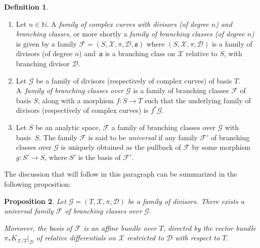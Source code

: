 \documentclass[10pt]{amsart}
\newcommand{\skpt}{\par\smallskip}
\newcommand{\N}{\mathbb N}
\theoremstyle{definition}
\newtheorem{definition}{Definition}[subsection]
\theoremstyle{plain}
\newtheorem{proposition}[definition]{Proposition}
\begin{document}
\skpt
\begin{definition}\label{definition_families_bc}
\begin{enumerate}
\item
Let $n \in \N$.
A \emph{family of complex curves with divisors (of degree $n$) and branching classes}, or more shortly a \emph{family of branching classes (of degree $n$)} is given by a family $\mathcal F = (S, \mathcal X, \pi, \mathcal D, \mathfrak a)$ where $(S, \mathcal X, \pi, \mathcal D)$ is a family of divisors (of degree $n$) and~$\mathfrak a$ is a branching class on $\mathcal X$ relative to $S$, with branching divisor $\mathcal D$.
\item
Let $\mathcal G$ be a family of divisors (respectively of complex curves) of basis $T$.
A~\emph{family of branching classes over $\mathcal G$} is a family of branching classes $\mathcal F$ of basis $S$, along with a morphism $f: S \to T$ such that the underlying family of divisors (respectively of complex curves) is $f^*\mathcal G$.
\item[(iii)]
Let $S$ be an analytic space, $\mathcal F$ a family of branching classes over $\mathcal G$ with basis~$S$.
The family $\mathcal F$ is said to be \emph{universal} if any family $\mathcal F'$ of branching classes over $\mathcal G$ is uniquely obtained as the pullback of $\mathcal F$ by some morphism $g: S' \to S$, where $S'$ is the basis of $\mathcal F'$.
\end{enumerate}
\end{definition}

The discussion that will follow in this paragraph can be summarized in the following proposition:

\begin{proposition}\label{proposition_universal_family_bc_over_divisor}
Let $\mathcal G = (T, \mathcal X, \pi, \mathcal D)$ be a family of divisors.
There exists a universal family $\mathcal F$ of branching classes over $\mathcal G$.

Moreover, the basis of $\mathcal F$ is an affine bundle over $T$, directed by the vector bundle $\pi_*K_{\mathcal X/T}|_{\mathcal D}$ of relative differentials on $\mathcal X$ restricted to $\mathcal D$ with respect to $T$.
\end{proposition}
\end{document}
